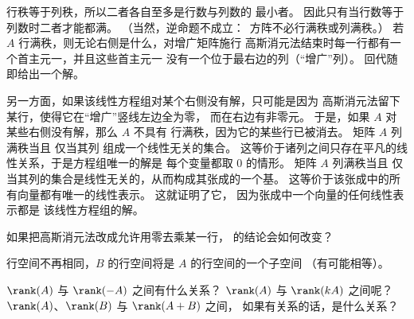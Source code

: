     \begin{answer}
      \begin{exparts}
        \partsitem 行秩等于列秩，所以二者各自至多是行数与列数的
          最小者。
          因此只有当行数等于列数时二者才能都满。
          （当然，逆命题不成立：~方阵不必行满秩或列满秩。）
        \partsitem 若 \( A \) 行满秩，则无论右侧是什么，对增广矩阵施行
          高斯消元法结束时每一行都有一个首主元一，并且这些首主元一
          没有一个位于最右边的列（“增广”列）。
          回代随即给出一个解。

          另一方面，如果该线性方程组对某个右侧没有解，只可能是因为
          高斯消元法留下某行，使得它在“增广”竖线左边全为零，
          而在右边有非零元。
          于是，如果 $A$ 对某些右侧没有解，那么 \( A \) 不具有
          行满秩，因为它的某些行已被消去。
        \partsitem 矩阵 \( A \) 列满秩当且
          仅当其列
          组成一个线性无关的集合。
          这等价于诸列之间只存在平凡的线性关系，于是方程组唯一的解是
          每个变量都取 $0$ 的情形。
        \partsitem 矩阵 \( A \) 列满秩当且
          仅当其列的集合是线性无关的，从而构成其张成的一个基。
          这等价于该张成中的所有向量都有唯一的线性表示。
          这就证明了它，
          因为张成中一个向量的任何线性表示都是
          该线性方程组的解。
      \end{exparts}
    \end{answer}
  \item
    如果把高斯消元法改成允许用零去乘某一行，
     的结论会如何改变？
    \begin{answer}
      行空间不再相同，$B$ 的行空间将是 $A$ 的行空间的一个子空间
      （有可能相等）。
    \end{answer}
  \item
    \( \rank(A) \) 与 \( \rank(-A) \) 之间有什么关系？
    \( \rank(A) \) 与 \( \rank(kA) \) 之间呢？
    \( \rank(A) \)、\( \rank(B) \) 与 \( \rank(A+B) \) 之间，
    如果有关系的话，是什么关系？
